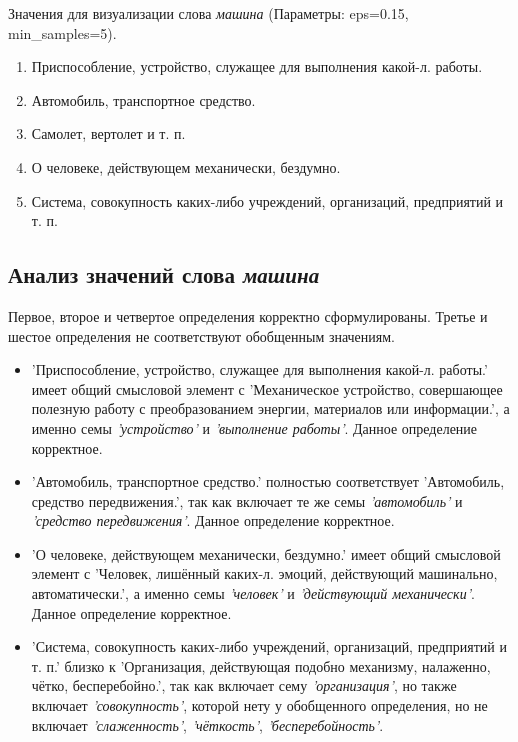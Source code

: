 Значения для визуализации слова \textit{машина} (Параметры: eps=0.15, min\_samples=5).

\begin{enumerate}
    \item Приспособление, устройство, служащее для выполнения какой-л. работы.
    \item Автомобиль, транспортное средство.
    \item Самолет, вертолет и т. п.
    \item О человеке, действующем механически, бездумно.
    \item Система, совокупность каких-либо учреждений, организаций, предприятий и т. п.
\end{enumerate}

\subsection*{Анализ значений слова \textit{машина}}

Первое, второе и четвертое определения корректно сформулированы.
Третье и шестое определения не соответствуют обобщенным значениям.

\begin{itemize}
    \item ’Приспособление, устройство, служащее для выполнения какой-л. работы.’ имеет общий смысловой элемент с
’Механическое устройство, совершающее полезную работу с преобразованием энергии, материалов или информации.’,
а именно семы \textit{’устройство’} и \textit{’выполнение работы’}.
Данное определение корректное.

    \item ’Автомобиль, транспортное средство.’ полностью соответствует
’Автомобиль, средство передвижения.’, так как включает те же семы \textit{’автомобиль’} и \textit{’средство передвижения’}.
Данное определение корректное.

    \item ’О человеке, действующем механически, бездумно.’ имеет общий смысловой элемент с
’Человек, лишённый каких-л. эмоций, действующий машинально, автоматически.’,
а именно семы \textit{’человек’} и \textit{’действующий механически’}.
Данное определение корректное.

    \item ’Система, совокупность каких-либо учреждений, организаций, предприятий и т. п.’ близко к
’Организация, действующая подобно механизму, налаженно, чётко, бесперебойно.’,
так как включает сему \textit{’организация’}, но также включает \textit{’совокупность’},
которой нету у обобщенного определения, но не включает \textit{’слаженность’}, \textit{’чёткость’}, \textit{’бесперебойность’}.%
\end{itemize}

